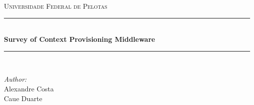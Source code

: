 \documentclass[12pt]{article} %
\begin{document}

\begin{titlepage}

\newcommand{\HRule}{\rule{\linewidth}{0.5mm}} %

\center %

\textsc{\LARGE Universidade Federal de Pelotas}\\[1.5cm] %

\HRule \\[0.4cm]
{ \huge \bfseries Survey of Context Provisioning Middleware}\\[0.4cm] %
\HRule \\[1.5cm]

\begin{minipage}{0.4\textwidth}
\begin{flushleft} \large
\emph{Author:}\\
Alexandre Costa \\
Caue Duarte
\end{flushleft}
\end{minipage}

\vfill %

\end{titlepage}




\end{document}
